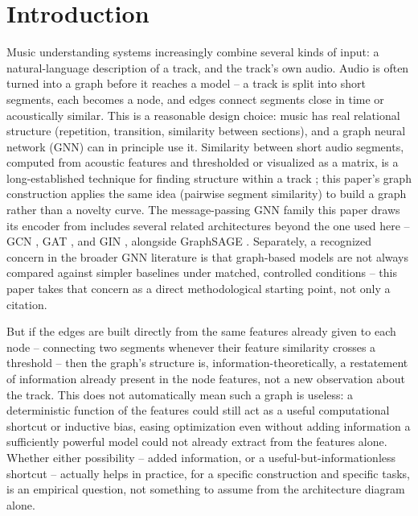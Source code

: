 \section{Introduction}

Music understanding systems increasingly combine several kinds of input: a natural-language
description of a track, and the track's own audio. Audio is often turned into a graph before
it reaches a model -- a track is split into short segments, each becomes a node, and edges
connect segments close in time or acoustically similar. This is a reasonable design choice:
music has real relational structure (repetition, transition, similarity between sections),
and a graph neural network (GNN) can in principle use it. Similarity between short audio
segments, computed from acoustic features and thresholded or visualized as a matrix, is a
long-established technique for finding structure within a track \cite{foote2000novelty};
this paper's graph construction applies the same idea (pairwise segment similarity) to build
a graph rather than a novelty curve. The message-passing GNN family this paper draws its
encoder from includes several related architectures beyond the one used here -- GCN
\cite{kipf2017gcn}, GAT \cite{velickovic2018gat}, and GIN \cite{xu2019gin}, alongside
GraphSAGE \cite{hamilton2017graphsage}. Separately, a recognized concern in the broader GNN
literature is that graph-based models are not always compared against simpler baselines
under matched, controlled conditions \cite{errica2020fair,shchur2018pitfalls} -- this paper
takes that concern as a direct methodological starting point, not only a citation.

But if the edges are built directly from the same features already given to each node --
connecting two segments whenever their feature similarity crosses a threshold -- then the
graph's structure is, information-theoretically, a restatement of information already
present in the node features, not a new observation about the track. This does not
automatically mean such a graph is useless: a deterministic function of the features could
still act as a useful computational shortcut or inductive bias, easing optimization even
without adding information a sufficiently powerful model could not already extract from the
features alone. Whether either possibility -- added information, or a
useful-but-informationless shortcut -- actually helps in practice, for a specific
construction and specific tasks, is an empirical question, not something to assume from the
architecture diagram alone.

